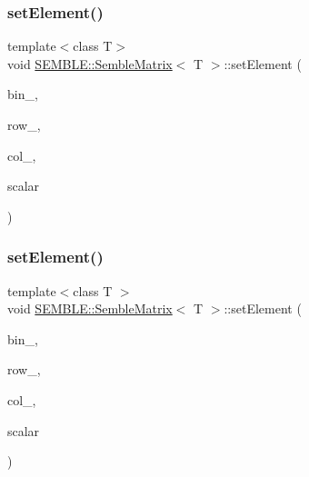 \subsubsection{\texorpdfstring{setElement()}{setElement()}\hspace{0.1cm}{\footnotesize\ttfamily [3/4]}}
{\footnotesize\ttfamily template$<$class T$>$ \\
void \mbox{\hyperlink{structSEMBLE_1_1SembleMatrix}{S\+E\+M\+B\+L\+E\+::\+Semble\+Matrix}}$<$ T $>$\+::set\+Element (\begin{DoxyParamCaption}\item[{int}]{bin\+\_\+,  }\item[{int}]{row\+\_\+,  }\item[{int}]{col\+\_\+,  }\item[{const typename \mbox{\hyperlink{structSEMBLE_1_1PromoteScalar}{Promote\+Scalar}}$<$ T $>$\+::Type \&}]{scalar }\end{DoxyParamCaption})}

\mbox{\label{structSEMBLE_1_1SembleMatrix_a5840aaaabbade4c2714f3bfd99d150a8}} 
\subsubsection{\texorpdfstring{setElement()}{setElement()}\hspace{0.1cm}{\footnotesize\ttfamily [4/4]}}
{\footnotesize\ttfamily template$<$class T $>$ \\
void \mbox{\hyperlink{structSEMBLE_1_1SembleMatrix}{S\+E\+M\+B\+L\+E\+::\+Semble\+Matrix}}$<$ T $>$\+::set\+Element (\begin{DoxyParamCaption}\item[{int}]{bin\+\_\+,  }\item[{int}]{row\+\_\+,  }\item[{int}]{col\+\_\+,  }\item[{const typename \mbox{\hyperlink{structSEMBLE_1_1PromoteScalar}{Promote\+Scalar}}$<$ T $>$\+::Type \&}]{scalar }\end{DoxyParamCaption})}

